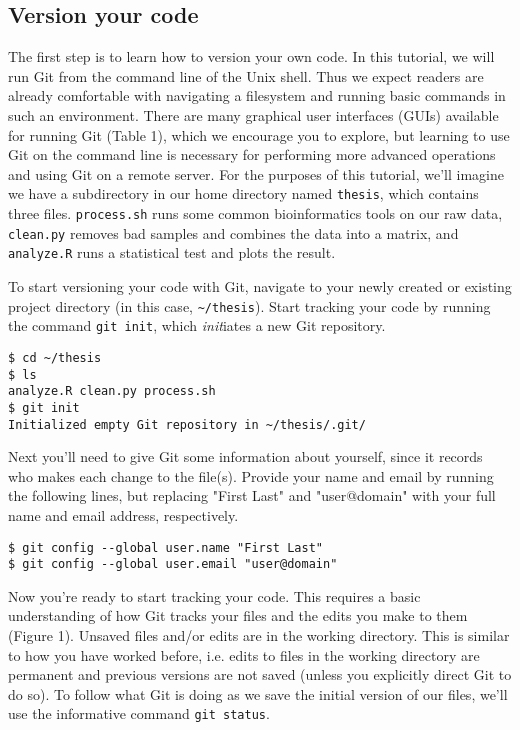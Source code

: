 \subsection{Version your code}

The first step is to learn how to version your own code. In this tutorial, we will run Git from the command line of the Unix shell. Thus we expect readers are already comfortable with navigating a filesystem and running basic commands in such an environment. There are many graphical user interfaces (GUIs) available for running Git (Table 1), which we encourage you to explore, but learning to use Git on the command line is necessary for performing more advanced operations and using Git on a remote server. For the purposes of this tutorial, we'll imagine we have a subdirectory in our home directory named \verb|thesis|, which contains three files. \verb|process.sh| runs some common bioinformatics tools on our raw data, \verb|clean.py| removes bad samples and combines the data into a matrix, and \verb|analyze.R| runs a statistical test and plots the result.

To start versioning your code with Git, navigate to your newly created or existing project directory (in this case, \verb|~/thesis|).  Start tracking your code by running the command \verb|git init|, which \textit{init}iates a new Git repository.

\begin{lstlisting}
$ cd ~/thesis
$ ls
analyze.R clean.py process.sh
$ git init
Initialized empty Git repository in ~/thesis/.git/
\end{lstlisting}

Next you'll need to give Git some information about yourself, since it records who makes each change to the file(s). Provide your name and email by running the following lines, but replacing "First Last" and "user@domain" with your full name and email address, respectively.

\begin{lstlisting}
$ git config --global user.name "First Last"
$ git config --global user.email "user@domain"
\end{lstlisting}

Now you're ready to start tracking your code.
This requires a basic understanding of how Git tracks your files and the edits you make to them (Figure 1).
Unsaved files and/or edits are in the working directory.
This is similar to how you have worked before, i.e. edits to files in the working directory are  permanent and previous versions are not saved (unless you explicitly direct Git to do so).
To follow what Git is doing as we save the initial version of our files, we'll use the informative command \verb|git status|.

